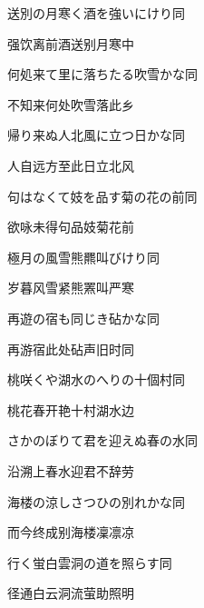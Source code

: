 \begin{haiku}
    {\FH 送別の月寒く酒を強いにけり}\hfill{\FH 同}

    {\FK 强饮离前酒送别月寒中}
\end{haiku}

\begin{haiku}
    {\FH 何処来て里に落ちたる吹雪かな}\hfill{\FH 同}

    {\FK 不知来何处吹雪落此乡}
\end{haiku}

\begin{haiku}
    {\FH 帰り来ぬ人北風に立つ日かな}\hfill{\FH 同}

    {\FK 人自远方至此日立北风}
\end{haiku}

\begin{haiku}
    {\FH 句はなくて妓を品す菊の花の前}\hfill{\FH 同}

    {\FK 欲咏未得句品妓菊花前}
\end{haiku}

\begin{haiku}
    {\FH 極月の風雪熊羆叫びけり}\hfill{\FH 同}

    {\FK 岁暮风雪紧熊罴叫严寒}
\end{haiku}

\begin{haiku}
    {\FH 再遊の宿も同じき砧かな}\hfill{\FH 同}

    {\FK 再游宿此处砧声旧时同}
\end{haiku}

\begin{haiku}
    {\FH 桃咲くや湖水のへりの十個村}\hfill{\FH 同}

    {\FK 桃花春开艳十村湖水边}
\end{haiku}

\begin{haiku}
    {\FH さかのぼりて君を迎えぬ春の水}\hfill{\FH 同}

    {\FK 沿溯上春水迎君不辞劳}
\end{haiku}

\begin{haiku}
    {\FH 海楼の涼しさつひの別れかな}\hfill{\FH 同}

    {\FK 而今终成别海楼凜凛凉}
\end{haiku}

\begin{haiku}
    {\FH 行く蛍白雲洞の道を照らす}\hfill{\FH 同}

    {\FK 径通白云洞流萤助照明}
\end{haiku}

